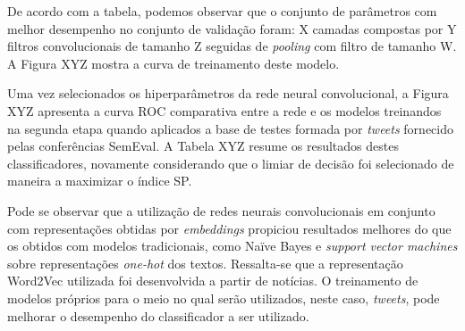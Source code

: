 De acordo com a tabela, podemos observar que o conjunto de parâmetros com melhor desempenho no conjunto de validação
foram: X camadas compostas por Y filtros convolucionais de tamanho Z seguidas de \textit{pooling} com filtro de tamanho
W.
A Figura XYZ mostra a curva de treinamento deste modelo.


Uma vez selecionados os hiperparâmetros da rede neural convolucional, a Figura XYZ apresenta a curva ROC comparativa
entre a rede e os modelos treinandos na segunda etapa quando aplicados a base de testes formada por \textit{tweets}
fornecido pelas conferências SemEval.
A Tabela XYZ resume os resultados destes classificadores, novamente considerando que o limiar de decisão foi selecionado
de maneira a maximizar o índice SP.



Pode se observar que a utilização de redes neurais convolucionais em conjunto com representações obtidas por
\textit{embeddings} propiciou resultados melhores do que os obtidos com modelos tradicionais, como Naïve Bayes e
\textit{support vector machines} sobre representações \textit{one-hot} dos textos.
Ressalta-se que a representação Word2Vec utilizada foi desenvolvida a partir de notícias.
O treinamento de modelos próprios para o meio no qual serão utilizados, neste caso, \textit{tweets}, pode melhorar o
desempenho do classificador a ser utilizado.
